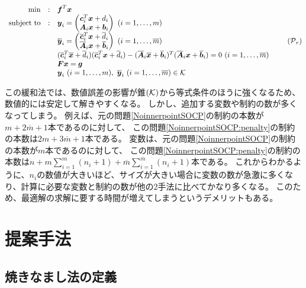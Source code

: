 \documentclass[11pt,a4paper,dvipdfmx,titlepage,uplatex]{jsarticle}
\theoremstyle{mystyle}
\newcommand{\0}{\mathbf{0}}
\def\b{\mbox{\boldmath $b$}}
\def\c{\mbox{\boldmath $c$}}
\def\f{\mbox{\boldmath $f$}}
\def\g{\mbox{\boldmath $g$}}
\def\x{\mbox{\boldmath $x$}}
\def\y{\mbox{\boldmath $y$}}
\def\A{\mbox{\boldmath $A$}}
\def\F{\mbox{\boldmath $F$}}
\def\KC{\mbox{$\cal K$}}
\def\PC{\mbox{$\cal P$}}
\begin{document}
\begin{align}
  \begin{array}{rcl}
    \min & : & \f^T \x \\
    \text{subject to} & : & \y_i = \begin{pmatrix}
    \c_i^T \x + d_i \\  \A_i \x + \b_i
  \end{pmatrix}
  \ (i=1, \ldots, m) \\
  & & \overline{\y}_i = \begin{pmatrix}
  \overline{\c}_i^T \x + \overline{d}_i \\  \overline{\A}_i \x + \overline{\b}_i
\end{pmatrix}
\ (i=1, \ldots, \overline{m}) \\
& & (\overline{\c}_i^T \overline{\x} + \overline{d}_i)(\overline{\c}_i^T \x + \overline{d}_i)
-
(\overline{\A}_i \overline{\x} + \overline{\b}_i)^T(\overline{\A}_i \x + \overline{\b}_i) = 0 \ (i=1, \ldots, \overline{m}) \\
& & \F \x = \g \\
& & \y_i \ (i=1, \ldots, m), \ \overline{\y}_i \ (i=1, \ldots, \overline{m}) \in \KC
\end{array}
\tag{$\PC_r$}
\label{NoinnerpointSOCP:relax}
\end{align}

この緩和法では、数値誤差の影響が錐$(\KC)$から等式条件のほうに強くなるため、
数値的には安定して解きやすくなる。
しかし、追加する変数や制約の数が多くなってしまう。
例えば、元の問題\eqref{NoinnerpointSOCP}の制約の本数が$m + 2 \overline{m} + 1$本であるのに対して、
この問題\eqref{NoinnerpointSOCP:penalty}の制約の本数は$2 m + 3 \overline{m} + 1$本である。
変数は、元の問題\eqref{NoinnerpointSOCP}の制約の本数が$m$本であるのに対して、
この問題\eqref{NoinnerpointSOCP:penalty}の制約の本数は$n + m\sum_{i=1}^m(n_i + 1) + \overline{m} \sum_{i=1}^{\overline{m}} (n_i + 1)$本である。
これからわかるように、$n_i$の数値が大きいほど、サイズが大きい場合に変数の数が急激に多くなり、計算に必要な変数と制約の数が他の2手法に比べてかなり多くなる。
このため、最適解の求解に要する時間が増えてしまうというデメリットもある。

\clearpage

\section{提案手法}\label{sec:SimulatedAnnealing}
\subsection{焼きなまし法の定義}
\end{document}
